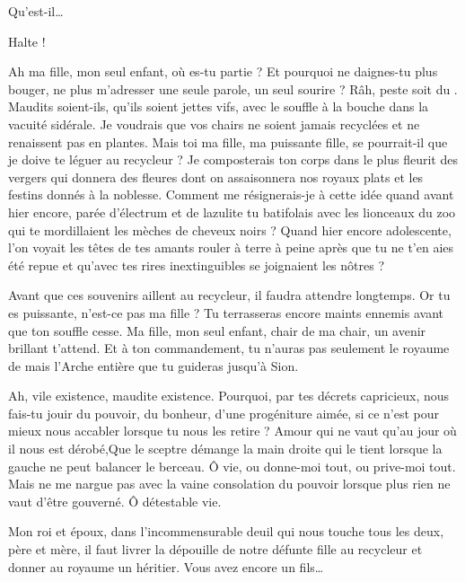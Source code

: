\begin{drama}

  \elenaspeaks {} Qu’est-il…

  \kingsgardsspeaks {} Halte !

  \roispeaks {}  Ah ma fille, mon seul enfant, où es-tu partie ? Et pourquoi ne daignes-tu plus bouger, ne plus m’adresser une seule parole, un seul sourire ? Râh, peste soit du \campoppose{}. Maudits soient-ils, qu’ils soient jettes vifs, avec le souffle à la bouche dans la vacuité sidérale. Je voudrais que vos chairs ne soient jamais recyclées et ne renaissent pas en plantes. Mais toi ma fille, ma puissante fille, se pourrait-il que je doive te léguer au recycleur ? Je composterais ton corps dans le plus fleurit des vergers qui donnera des fleures dont on assaisonnera nos royaux plats et les festins donnés à la noblesse. 
  Comment me résignerais-je à cette idée quand avant hier encore, parée d’électrum et de lazulite tu batifolais avec les lionceaux du zoo qui te mordillaient les mèches de cheveux noirs ? Quand hier encore adolescente, l’on voyait les têtes  de tes amants rouler à terre à peine après que tu ne t’en aies été repue et qu’avec tes rires inextinguibles se joignaient les nôtres ?

  Avant que ces souvenirs aillent au recycleur, il faudra attendre longtemps. Or tu es puissante, n’est-ce pas ma fille ? Tu terrasseras encore maints ennemis avant que ton souffle cesse. Ma fille, mon seul enfant, chair de ma chair, un avenir brillant t’attend. Et à ton commandement, tu n’auras pas seulement le royaume de \campprincipal{} mais l’Arche entière que tu guideras jusqu’à Sion.

  Ah, vile existence, maudite existence. Pourquoi, par tes décrets capricieux, nous fais-tu jouir du pouvoir, du bonheur, d’une progéniture aimée, si ce n’est pour mieux nous accabler lorsque tu nous les retire ? Amour qui ne vaut qu’au jour où il nous est dérobé,Que le sceptre démange la main droite qui le tient lorsque la gauche ne peut balancer le berceau. Ô vie, ou donne-moi tout, ou prive-moi tout. Mais ne me nargue pas  avec la vaine consolation du pouvoir lorsque plus rien ne vaut d’être gouverné. Ô détestable vie.

  \reinespeaks {} Mon roi et époux, dans l’incommensurable deuil qui nous touche tous les deux, père et mère, il faut livrer la dépouille de notre défunte fille au recycleur et donner au royaume un héritier. Vous avez encore un fils…


\end{drama}
